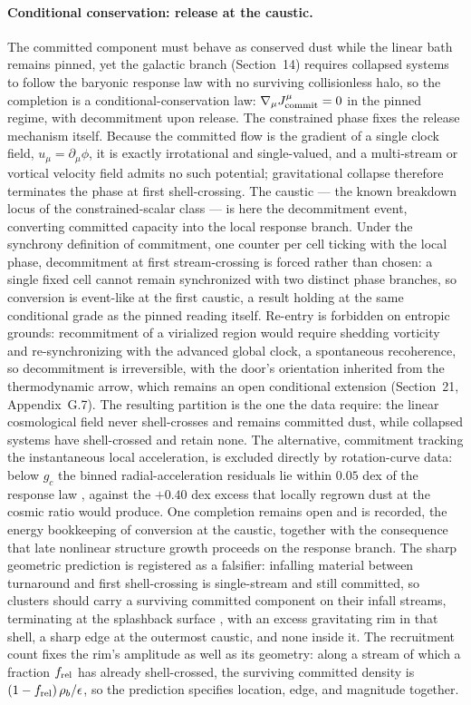 \documentclass[11pt]{article}
\begin{document}
\paragraph{Conditional conservation: release at the caustic.}
The committed component must behave as conserved dust while the linear bath remains pinned, yet the galactic branch (Section~14) requires collapsed systems to follow the baryonic response law with no surviving collisionless halo, so the completion is a conditional-conservation law: $\nabla_\mu J^\mu_{\rm commit}=0$ in the pinned regime, with decommitment upon release. The constrained phase fixes the release mechanism itself. Because the committed flow is the gradient of a single clock field, $u_\mu=\partial_\mu\phi$, it is exactly irrotational and single-valued, and a multi-stream or vortical velocity field admits no such potential; gravitational collapse therefore terminates the phase at first shell-crossing. The caustic --- the known breakdown locus of the constrained-scalar class --- is here the decommitment event, converting committed capacity into the local response branch. Under the synchrony definition of commitment, one counter per cell ticking with the local phase, decommitment at first stream-crossing is forced rather than chosen: a single fixed cell cannot remain synchronized with two distinct phase branches, so conversion is event-like at the first caustic, a result holding at the same conditional grade as the pinned reading itself. Re-entry is forbidden on entropic grounds: recommitment of a virialized region would require shedding vorticity and re-synchronizing with the advanced global clock, a spontaneous recoherence, so decommitment is irreversible, with the door's orientation inherited from the thermodynamic arrow, which remains an open conditional extension (Section~21, Appendix~G.7). The resulting partition is the one the data require: the linear cosmological field never shell-crosses and remains committed dust, while collapsed systems have shell-crossed and retain none. The alternative, commitment tracking the instantaneous local acceleration, is excluded directly by rotation-curve data: below $g_c$ the binned radial-acceleration residuals lie within $0.05$ dex of the response law \citep{McGaugh2016}, against the $+0.40$ dex excess that locally regrown dust at the cosmic ratio would produce. One completion remains open and is recorded, the energy bookkeeping of conversion at the caustic, together with the consequence that late nonlinear structure growth proceeds on the response branch. The sharp geometric prediction is registered as a falsifier: infalling material between turnaround and first shell-crossing is single-stream and still committed, so clusters should carry a surviving committed component on their infall streams, terminating at the splashback surface \citep{More2015}, with an excess gravitating rim in that shell, a sharp edge at the outermost caustic, and none inside it. The recruitment count fixes the rim's amplitude as well as its geometry: along a stream of which a fraction $f_{\rm rel}$ has already shell-crossed, the surviving committed density is $(1-f_{\rm rel})\,\rho_b/\epsilon$, so the prediction specifies location, edge, and magnitude together.
\end{document}

